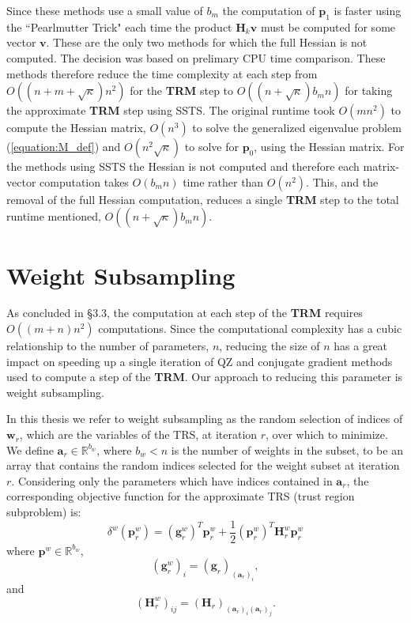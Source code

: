 \documentclass[letterpaper,12pt,titlepage,oneside,final]{book}
\begin{document}
	Since these methods use a small value of $b_{m}$ the computation of $\mathbf{p}_{1}$ is faster using the ``Pearlmutter Trick" each time the product $\mathbf{H}_{k}\mathbf{v}$ must be computed for some vector $\mathbf{v}$. These are the only two methods for which the full Hessian is not computed. The decision was based on prelimary CPU time comparison. These methods therefore reduce the time complexity at each step from $O((n+m+\sqrt{\kappa})n^{2})$ for the \textbf{TRM} step to $O((n + \sqrt{\kappa})b_{m}n)$ for taking the approximate \textbf{TRM} step using SSTS. The original runtime took $O(mn^{2})$ to compute the Hessian matrix, $O(n^{3})$ to solve the generalized eigenvalue problem (\ref{equation:M_def}) and $O(n^{2}\sqrt{\kappa})$ to solve for $\mathbf{p}_{0}$, using the Hessian matrix. For the methods using SSTS the Hessian is not computed and therefore each matrix-vector computation takes $O(b_{m}n)$ time rather than $O(n^{2})$. This, and the removal of the full Hessian computation, reduces a single \textbf{TRM} step to the total runtime mentioned, $O((n + \sqrt{\kappa})b_{m}n)$.
	
	\section{Weight Subsampling}
	
	As concluded in \S{3.3}, the computation at each step of the \textbf{TRM} requires $O((m + n)n^{2})$ computations. Since the computational complexity has a cubic relationship to the number of parameters, $n$, reducing the size of $n$ has a great impact on speeding up a single iteration of QZ and conjugate gradient methods used to compute a step of the \textbf{TRM}. Our approach to reducing this parameter is weight subsampling.
	
	In this thesis we refer to weight subsampling as the random selection of indices of $\mathbf{w}_{r}$, which are the variables of the TRS, at iteration $r$, over which to minimize. We define $\mathbf{a}_{r} \in \mathbb{R}^{b_{w}}$, where $b_{w} < n$ is the number of weights in the subset, to be an array that contains the random indices selected for the weight subset at iteration $r$. Considering only the parameters which have indices contained in $\mathbf{a}_{r}$, the corresponding objective function for the approximate TRS (trust region subproblem) is:
	\begin{equation}
	\delta^{w}(\mathbf{p}_{r}^{w}) = (\mathbf{g}_{r}^{w})^{T}\mathbf{p}_{r}^{w} + \frac{1}{2}(\mathbf{p}_{r}^{w})^{T}\mathbf{H}_{r}^{w}\mathbf{p}_{r}^{w}
	\label{equation:w_subset}
	\end{equation}
	where $\mathbf{p}^{w} \in \mathbb{R}^{b_{w}}$, 
	\begin{equation}
	(\mathbf{g}^{w}_{r})_{i} = (\mathbf{g}_{r})_{(\mathbf{a}_{r})_{i}},
	\end{equation}
	and
	\begin{equation}
	(\mathbf{H}^{w}_{r})_{ij} = (\mathbf{H}_{r})_{(\mathbf{a}_{r})_{i}(\mathbf{a}_{r})_{j}}.
	\end{equation}
	
\end{document}
